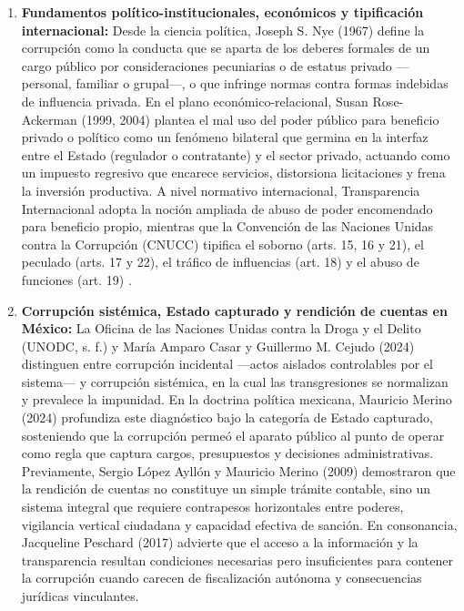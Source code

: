 \begin{enumerate}
  \item \textbf{Fundamentos político-institucionales, económicos y tipificación internacional:} Desde la ciencia política, Joseph S. Nye (1967) define la corrupción como la conducta que se aparta de los deberes formales de un cargo público por consideraciones pecuniarias o de estatus privado ---personal, familiar o grupal---, o que infringe normas contra formas indebidas de influencia privada. En el plano económico-relacional, Susan Rose-Ackerman (1999, 2004) plantea el mal uso del poder público para beneficio privado o político como un fenómeno bilateral que germina en la interfaz entre el Estado (regulador o contratante) y el sector privado, actuando como un impuesto regresivo que encarece servicios, distorsiona licitaciones y frena la inversión productiva. A nivel normativo internacional, Transparencia Internacional adopta la noción ampliada de abuso de poder encomendado para beneficio propio, mientras que la Convención de las Naciones Unidas contra la Corrupción (CNUCC) tipifica el soborno (arts. 15, 16 y 21), el peculado (arts. 17 y 22), el tráfico de influencias (art. 18) y el abuso de funciones (art. 19) \citep{unodc2003}.

  \item \textbf{Corrupción sistémica, Estado capturado y rendición de cuentas en México:} La Oficina de las Naciones Unidas contra la Droga y el Delito (UNODC, s. f.) y María Amparo Casar y Guillermo M. Cejudo (2024) distinguen entre corrupción incidental ---actos aislados controlables por el sistema--- y corrupción sistémica, en la cual las transgresiones se normalizan y prevalece la impunidad. En la doctrina política mexicana, Mauricio Merino (2024) profundiza este diagnóstico bajo la categoría de Estado capturado, sosteniendo que la corrupción permeó el aparato público al punto de operar como regla que captura cargos, presupuestos y decisiones administrativas. Previamente, Sergio López Ayllón y Mauricio Merino (2009) demostraron que la rendición de cuentas no constituye un simple trámite contable, sino un sistema integral que requiere contrapesos horizontales entre poderes, vigilancia vertical ciudadana y capacidad efectiva de sanción. En consonancia, Jacqueline Peschard (2017) advierte que el acceso a la información y la transparencia resultan condiciones necesarias pero insuficientes para contener la corrupción cuando carecen de fiscalización autónoma y consecuencias jurídicas vinculantes.


\end{enumerate}

